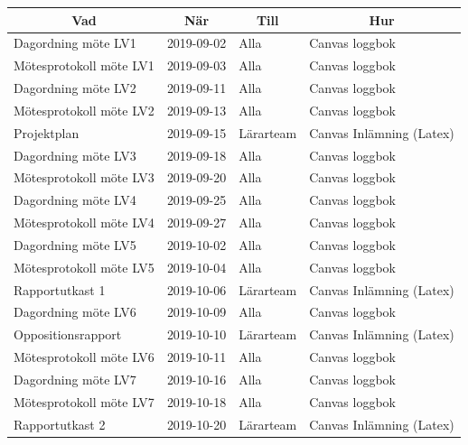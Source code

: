 \documentclass[a4paper]{article}
\begin{document}
\begin{tabular}{|l|l|l|l|}
\hline
\multicolumn{1}{c}{\bfseries Vad} & \multicolumn{1}{c}{\bfseries När} & \multicolumn{1}{c}{\bfseries Till} & \multicolumn{1}{c}{\bfseries Hur} \\ \hline
Dagordning möte LV1 & 2019-09-02 & Alla & Canvas loggbok \\ \hline
Mötesprotokoll möte LV1 & 2019-09-03 & Alla & Canvas loggbok \\ \hline

Dagordning möte LV2 & 2019-09-11 & Alla & Canvas loggbok \\ \hline
Mötesprotokoll möte LV2 & 2019-09-13 & Alla & Canvas loggbok \\ \hline

Projektplan & 2019-09-15 & Lärarteam & Canvas Inlämning (Latex) \\ \hline

Dagordning möte LV3 & 2019-09-18 & Alla & Canvas loggbok \\ \hline
Mötesprotokoll möte LV3 & 2019-09-20 & Alla & Canvas loggbok \\ \hline

Dagordning möte LV4 & 2019-09-25 & Alla & Canvas loggbok \\ \hline
Mötesprotokoll möte LV4 & 2019-09-27 & Alla & Canvas loggbok \\ \hline

Dagordning möte LV5 & 2019-10-02 & Alla & Canvas loggbok \\ \hline
Mötesprotokoll möte LV5 & 2019-10-04 & Alla & Canvas loggbok \\ \hline

Rapportutkast 1 & 2019-10-06 & Lärarteam & Canvas Inlämning (Latex) \\ \hline

Dagordning möte LV6 & 2019-10-09 & Alla & Canvas loggbok \\ \hline
Oppositionsrapport & 2019-10-10 & Lärarteam & Canvas Inlämning (Latex) \\ \hline
Mötesprotokoll möte LV6 & 2019-10-11 & Alla & Canvas loggbok \\ \hline

Dagordning möte LV7 & 2019-10-16 & Alla & Canvas loggbok \\ \hline
Mötesprotokoll möte LV7 & 2019-10-18 & Alla & Canvas loggbok \\ \hline
Rapportutkast 2 & 2019-10-20 & Lärarteam & Canvas Inlämning (Latex) \\ \hline


\end{tabular}
\end{document}
